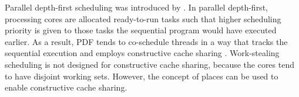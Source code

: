 Parallel depth-first scheduling was introduced by
\textcite{Blelloch1999}. In parallel depth-first, processing cores are
allocated ready-to-run tasks such that higher scheduling priority is
given to those tasks the sequential program would have executed
earlier. As a result, PDF tends to co-schedule threads in a way that
tracks the sequential execution and employs constructive cache sharing
\cite{Liaskovitis2006, Chen2007}. Work-stealing scheduling is not
designed for constructive cache sharing, because the cores tend to
have disjoint working sets. However, the concept of places can be used
to enable constructive cache sharing.


